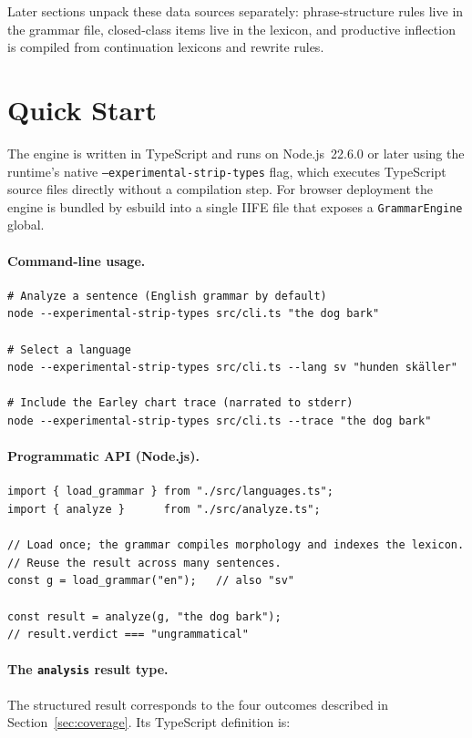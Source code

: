 \documentclass[11pt]{article}
\theoremstyle{definition}
\theoremstyle{plain}
\theoremstyle{remark}
\begin{document}
Later sections unpack these data sources separately: phrase-structure rules
live in the grammar file, closed-class items live in the lexicon, and productive
inflection is compiled from continuation lexicons and rewrite rules.

\section{Quick Start}
\label{sec:quickstart}

The engine is written in TypeScript and runs on Node.js~22.6.0 or later using the
runtime's native \texttt{--experimental-strip-types} flag, which executes TypeScript
source files directly without a compilation step. For browser deployment the engine is
bundled by esbuild into a single IIFE file that exposes a \texttt{GrammarEngine} global.

\paragraph{Command-line usage.}

\begin{lstlisting}[language={}]
# Analyze a sentence (English grammar by default)
node --experimental-strip-types src/cli.ts "the dog bark"

# Select a language
node --experimental-strip-types src/cli.ts --lang sv "hunden skäller"

# Include the Earley chart trace (narrated to stderr)
node --experimental-strip-types src/cli.ts --trace "the dog bark"
\end{lstlisting}

\paragraph{Programmatic API (Node.js).}

\begin{lstlisting}[language={}]
import { load_grammar } from "./src/languages.ts";
import { analyze }      from "./src/analyze.ts";

// Load once; the grammar compiles morphology and indexes the lexicon.
// Reuse the result across many sentences.
const g = load_grammar("en");   // also "sv"

const result = analyze(g, "the dog bark");
// result.verdict === "ungrammatical"
\end{lstlisting}

\paragraph{The \texttt{analysis} result type.}
The structured result corresponds to the four outcomes described in
Section~\ref{sec:coverage}. Its TypeScript definition is:
\end{document}
